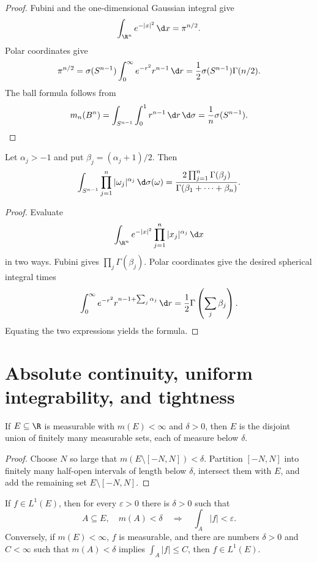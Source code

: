 \begin{proof}
Fubini and the one-dimensional Gaussian integral give
\[
\int_{\R^n}e^{-|x|^2}\,\d x=\pi^{n/2}.
\]
Polar coordinates give
\[
\pi^{n/2}
 =\sigma(S^{n-1})\int_0^\infty e^{-r^2}r^{n-1}\,\d r
 =\frac12\sigma(S^{n-1})\Gamma(n/2).
\]
The ball formula follows from
\[
m_n(B^n)=\int_{S^{n-1}}\int_0^1r^{n-1}\,\d r\,\d\sigma
 =\frac1n\sigma(S^{n-1}).
\]
\end{proof}

\begin{prop}
Let $\alpha_j>-1$ and put $\beta_j=(\alpha_j+1)/2$. Then
\[
\int_{S^{n-1}}\prod_{j=1}^n|\omega_j|^{\alpha_j}\,\d\sigma(\omega)
 =\frac{2\prod_{j=1}^n\Gamma(\beta_j)}
        {\Gamma(\beta_1+\cdots+\beta_n)}.
\]
\end{prop}

\begin{proof}
Evaluate
\[
\int_{\R^n}e^{-|x|^2}\prod_{j=1}^n|x_j|^{\alpha_j}\,\d x
\]
in two ways. Fubini gives $\prod_j\Gamma(\beta_j)$. Polar coordinates give the desired spherical integral times
\[
\int_0^\infty e^{-r^2}r^{n-1+\sum_j\alpha_j}\,\d r
 =\frac12\Gamma\left(\sum_j\beta_j\right).
\]
Equating the two expressions yields the formula.
\end{proof}

\section{Absolute continuity, uniform integrability, and tightness}

\begin{lem}
If $E\subseteq\R$ is measurable with $m(E)<\infty$ and $\delta>0$, then $E$ is the disjoint union of finitely many measurable sets, each of measure below $\delta$.
\end{lem}

\begin{proof}
Choose $N$ so large that $m(E\setminus[-N,N])<\delta$. Partition $[-N,N]$ into finitely many half-open intervals of length below $\delta$, intersect them with $E$, and add the remaining set $E\setminus[-N,N]$.
\end{proof}

\begin{thm}
If $f\in L^1(E)$, then for every $\varepsilon>0$ there is $\delta>0$ such that
\[
A\subseteq E,\quad m(A)<\delta
\quad\Longrightarrow\quad
\int_A|f|<\varepsilon.
\]
Conversely, if $m(E)<\infty$, $f$ is measurable, and there are numbers $\delta>0$ and $C<\infty$ such that $m(A)<\delta$ implies $\int_A|f|\leq C$, then $f\in L^1(E)$.
\end{thm}

